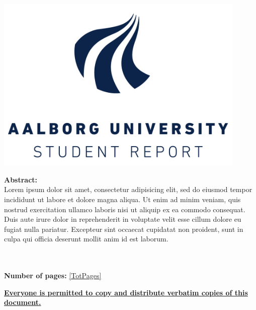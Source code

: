  ~
\begin{minipage}[T]{0.45\textwidth}
 \begin{flushright}
  \includegraphics[width=0.9\textwidth]{images/aau_logo.pdf}\\
 \end{flushright}
 \begin{flushleft}
  \textbf{Abstract:}\\
  Lorem ipsum dolor sit amet, consectetur adipisicing elit, sed do eiusmod tempor incididunt ut labore et dolore magna aliqua. Ut enim ad minim veniam, quis nostrud exercitation ullamco laboris nisi ut aliquip ex ea commodo consequat. Duis aute irure dolor in reprehenderit in voluptate velit esse cillum dolore eu fugiat nulla pariatur. Excepteur sint occaecat cupidatat non proident, sunt in culpa qui officia deserunt mollit anim id est laborum.


 \end{flushleft}
\end{minipage}\\
\\\large{\textsf{\textbf{\normalsize{Number of pages:}}}} \ref{TotPages}\\
\begin{center}
 \begin{scriptsize}
  \textbf{\underline{Everyone is permitted to copy and distribute verbatim copies of this document.}}
 \end{scriptsize}
\end{center}
